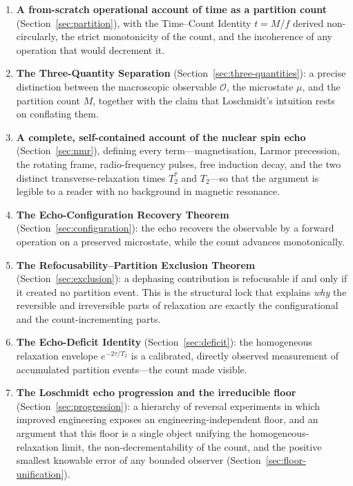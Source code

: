 \documentclass[11pt,a4paper]{article}
\theoremstyle{thmstyle}
\theoremstyle{definition}
\theoremstyle{remark}
\newcommand{\Tprep}{T_{2}^{*}}
\newcommand{\Ttwo}{T_{2}}
\newcommand{\Obs}{\mathcal{O}}
\newcommand{\Mic}{\mu}
\newcommand{\Count}{M}
\begin{document}
\begin{enumerate}[leftmargin=1.4em,itemsep=0.25em]
\item \textbf{A from-scratch operational account of time as a partition
count} (Section~\ref{sec:partition}), with the Time--Count Identity
$t=\Count/f$ derived non-circularly, the strict monotonicity of the
count, and the incoherence of any operation that would decrement it.

\item \textbf{The Three-Quantity Separation}
(Section~\ref{sec:three-quantities}): a precise distinction between the
macroscopic observable $\Obs$, the microstate $\Mic$, and the partition
count $\Count$, together with the claim that Loschmidt's intuition rests
on conflating them.

\item \textbf{A complete, self-contained account of the nuclear spin
echo} (Section~\ref{sec:nmr}), defining every term---magnetisation,
Larmor precession, the rotating frame, radio-frequency pulses, free
induction decay, and the two distinct transverse-relaxation times
$\Tprep$ and $\Ttwo$---so that the argument is legible to a reader with
no background in magnetic resonance.

\item \textbf{The Echo-Configuration Recovery Theorem}
(Section~\ref{sec:configuration}): the echo recovers the observable by a
forward operation on a preserved microstate, while the count advances
monotonically.

\item \textbf{The Refocusability--Partition Exclusion Theorem}
(Section~\ref{sec:exclusion}): a dephasing contribution is refocusable
if and only if it created no partition event. This is the structural
lock that explains \emph{why} the reversible and irreversible parts of
relaxation are exactly the configurational and the count-incrementing
parts.

\item \textbf{The Echo-Deficit Identity}
(Section~\ref{sec:deficit}): the homogeneous relaxation envelope
$e^{-2\tau/\Ttwo}$ is a calibrated, directly observed measurement of
accumulated partition events---the count made visible.

\item \textbf{The Loschmidt echo progression and the irreducible floor}
(Section~\ref{sec:progression}): a hierarchy of reversal experiments in
which improved engineering exposes an engineering-independent floor, and
an argument that this floor is a single object unifying the
homogeneous-relaxation limit, the non-decrementability of the count, and
the positive smallest knowable error of any bounded observer
(Section~\ref{sec:floor-unification}).
\end{enumerate}
\end{document}
